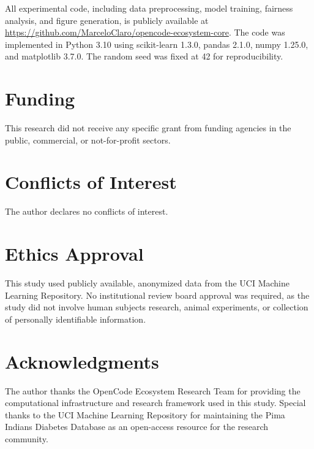 \documentclass[12pt,a4paper]{article}
\begin{document}
All experimental code, including data preprocessing, model training, 
fairness analysis, and figure generation, is publicly available at 
\url{https://github.com/MarceloClaro/opencode-ecosystem-core}. 
The code was implemented in Python 3.10 using scikit-learn 1.3.0, 
pandas 2.1.0, numpy 1.25.0, and matplotlib 3.7.0. The random seed 
was fixed at 42 for reproducibility.

\section*{Funding}

This research did not receive any specific grant from funding agencies 
in the public, commercial, or not-for-profit sectors.

\section*{Conflicts of Interest}

The author declares no conflicts of interest.

\section*{Ethics Approval}

This study used publicly available, anonymized data from the UCI Machine 
Learning Repository. No institutional review board approval was required, 
as the study did not involve human subjects research, animal experiments, 
or collection of personally identifiable information.

\section*{Acknowledgments}

The author thanks the OpenCode Ecosystem Research Team for providing the 
computational infrastructure and research framework used in this study. 
Special thanks to the UCI Machine Learning Repository for maintaining 
the Pima Indians Diabetes Database as an open-access resource for the 
research community.

\end{document}
